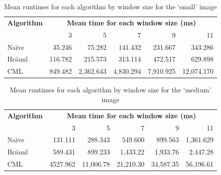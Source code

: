 \begin{table}
\centering
\caption[Mean runtimes for each algorithm for the `small' image]{Mean runtimes for each algorithm by window size for the `small' image}
\label{tab:median:small}
\begin{tabular}{@{}lrrrrr@{}}
\toprule
\multicolumn{1}{c}{\textbf{Algorithm}} & \multicolumn{5}{c}{\textbf{Mean time for each window size (ms)}}  \\
                              & 3       & 5         & 7         & 9         & 11         \\ \midrule
Naïve                         & 35.246  & 75.282    & 141.432   & 231.667   & 343.286    \\
Bräunl                        & 116.782 & 215.573   & 313.114   & 472.517   & 629.898    \\
CML                           & 849.482 & 2,362.643 & 4,830.294 & 7,910.925 & 12,074.170 \\ \bottomrule
\end{tabular}
\end{table}

\begin{table}
\centering
\caption[Mean runtimes for each algorithm for the `medium' image]{Mean runtimes for each algorithm by window size for the `medium' image}
\label{tab:median:medium}
\begin{tabular}{@{}lrrrrr@{}}
\toprule
\multicolumn{1}{c}{\textbf{Algorithm}} & \multicolumn{5}{c}{\textbf{Mean time for each window size (ms)}}      \\
\multicolumn{1}{r}{}                   & \multicolumn{1}{r}{3} & 5         & 7         & 9         & 11        \\ \midrule
Naïve                                  & 131.111               & 288.343   & 549.600   & 899.563   & 1,361.629 \\
Bräunl                                 & 589.431
               & 899.233   & 1,433.22  & 1,933.76  & 2,447.28  \\
CML                                    & 4527.962
               & 11,006.78 & 21,210.30 & 34,587.35 & 56,196.61 \\ \bottomrule
\end{tabular}
\end{table}

